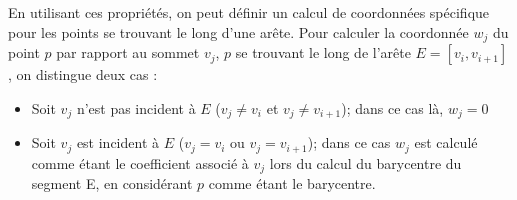 En utilisant ces propriétés, on peut définir un calcul de coordonnées spécifique
pour les points se trouvant le long d'une arête. Pour calculer la coordonnée
$w_j$ du point $p$ par rapport au sommet $v_j$, $p$ se trouvant le long de l'arête
$E = [v_i,v_{i+1}]$, on distingue deux cas :

\begin{itemize}
\item Soit $v_j$ n'est pas incident à $E$ ($v_j \neq v_i$ et $v_j \neq
v_{i+1}$); dans ce cas là, $w_j = 0$
\item Soit $v_j$ est incident à $E$ ($v_j = v_i$ ou $v_j = v_{i+1}$); dans ce
cas $w_j$ est calculé comme étant le coefficient associé à $v_j$ lors du calcul
du barycentre du segment E, en considérant $p$ comme étant le barycentre.
\end{itemize}